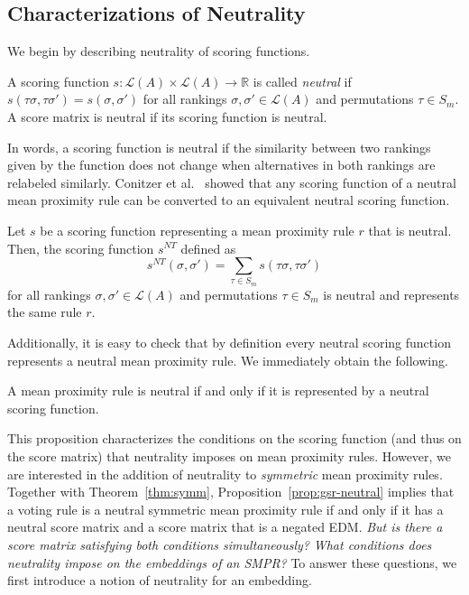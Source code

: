 \documentclass[prodmode]{acmsmall-ec14}
\newcommand{\calL}{{\mathcal{L}}}
\newcommand{\rank}{{\calL(A)}}
\newcommand{\nt}{NT}
\begin{document}
\subsection{Characterizations of Neutrality}
\label{sec:charact}

We begin by describing neutrality of scoring functions. 

\begin{definition}
A scoring function $s: \rank \times \rank \rightarrow \mathbb{R}$ is called \emph{neutral} if $s(\tau \sigma, \tau \sigma') = s(\sigma,\sigma')$ for all rankings $\sigma,\sigma' \in \rank$ and permutations $\tau \in S_m$. A score matrix is neutral if its scoring function is neutral. 
\end{definition}
In words, a scoring function is neutral if the similarity between two rankings given by the function does not change when alternatives in both rankings are relabeled similarly. Conitzer et al.~ showed that any scoring function of a neutral mean proximity rule can be converted to an equivalent neutral scoring function.

\begin{proposition} Let $s$ be a scoring function representing a mean proximity rule $r$ that is neutral. Then, the scoring function $s^{\nt}$ defined as
\begin{equation}
s^{\nt}(\sigma,\sigma') = \sum_{\tau \in S_m} s(\tau \sigma, \tau \sigma')
\label{eqn:s-nt}
\end{equation}
for all rankings $\sigma,\sigma' \in \rank$ and permutations $\tau \in S_m$ is neutral and represents the same rule $r$.
\label{prop:neutral-scoring}
\end{proposition}
%
Additionally, it is easy to check that by definition every neutral scoring function represents a neutral mean proximity rule. We immediately obtain the following.
 
\begin{proposition}
A mean proximity rule is neutral if and only if it is represented by a neutral scoring function.
\label{prop:gsr-neutral}
\end{proposition}
%
This proposition characterizes the conditions on the scoring function (and thus on the score matrix) that neutrality imposes on mean proximity rules. However, we are interested in the addition of neutrality to \emph{symmetric} mean proximity rules. Together with Theorem~\ref{thm:symm}, Proposition~\ref{prop:gsr-neutral} implies that a voting rule is a neutral symmetric mean proximity rule if and only if it has a neutral score matrix and a score matrix that is a negated EDM. \emph{But is there a score matrix satisfying both conditions simultaneously?} \emph{What conditions does neutrality impose on the embeddings of an SMPR?} To answer these questions, we first introduce a notion of neutrality for an embedding.
\end{document}
